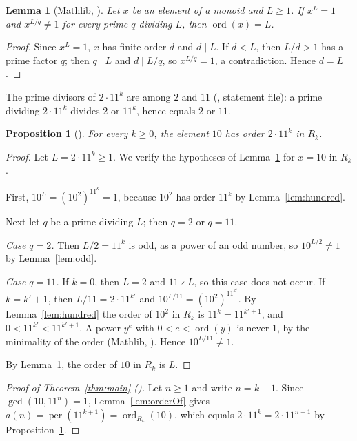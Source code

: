 \documentclass[11pt]{amsart}
\theoremstyle{plain}
\newtheorem{lemma}[theorem]{Lemma}
\newtheorem{proposition}[theorem]{Proposition}
\theoremstyle{definition}
\newcommand{\ord}{\operatorname{ord}}
\newcommand{\per}{\operatorname{per}}
\begin{document}
\begin{lemma}[Mathlib, ]\label{lem:crit}
Let $x$ be an element of a monoid and $L\ge1$. If $x^L=1$ and $x^{L/q}\ne1$ for every prime $q$ dividing $L$, then $\ord(x)=L$.
\end{lemma}

\begin{proof}
Since $x^L=1$, $x$ has finite order $d$ and $d\mid L$. If $d<L$, then $L/d>1$ has a prime factor $q$; then $q\mid L$ and $d\mid L/q$, so $x^{L/q}=1$, a contradiction. Hence $d=L$.
\end{proof}

The prime divisors of $2\cdot11^k$ are among $2$ and $11$ (, statement file): a prime dividing $2\cdot 11^k$ divides $2$ or $11^k$, hence equals $2$ or $11$.

\begin{proposition}[]\label{prop:ten}
For every $k\ge0$, the element $10$ has order $2\cdot 11^k$ in $R_k$.
\end{proposition}

\begin{proof}
Let $L=2\cdot11^k\ge1$. We verify the hypotheses of Lemma~\ref{lem:crit} for $x=10$ in $R_k$.

First, $10^L=(10^2)^{11^k}=1$, because $10^2$ has order $11^k$ by Lemma~\ref{lem:hundred}.

Next let $q$ be a prime dividing $L$; then $q=2$ or $q=11$.

\emph{Case $q=2$.} Then $L/2=11^k$ is odd, as a power of an odd number, so $10^{L/2}\ne1$ by Lemma~\ref{lem:odd}.

\emph{Case $q=11$.} If $k=0$, then $L=2$ and $11\nmid L$, so this case does not occur. If $k=k'+1$, then $L/11=2\cdot11^{k'}$ and $10^{L/11}=(10^2)^{11^{k'}}$. By Lemma~\ref{lem:hundred} the order of $10^2$ in $R_k$ is $11^{k}=11^{k'+1}$, and $0<11^{k'}<11^{k'+1}$. A power $y^e$ with $0<e<\ord(y)$ is never $1$, by the minimality of the order (Mathlib, ). Hence $10^{L/11}\ne1$.

By Lemma~\ref{lem:crit}, the order of $10$ in $R_k$ is $L$.
\end{proof}

\begin{proof}[Proof of Theorem~\ref{thm:main} ()]
Let $n\ge1$ and write $n=k+1$. Since $\gcd(10,11^n)=1$, Lemma~\ref{lem:orderOf} gives $a(n)=\per(11^{k+1})=\ord_{R_k}(10)$, which equals $2\cdot11^k=2\cdot11^{n-1}$ by Proposition~\ref{prop:ten}.
\end{proof}
\end{document}

